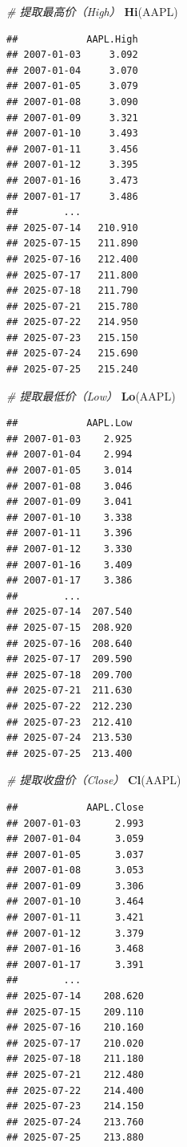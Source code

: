 \documentclass[]{ctexbook}
\newenvironment{Shaded}{\begin{snugshade}}{\end{snugshade}}
\newcommand{\CommentTok}[1]{\textcolor[rgb]{0.56,0.35,0.01}{\textit{#1}}}
\newcommand{\FunctionTok}[1]{\textcolor[rgb]{0.13,0.29,0.53}{\textbf{#1}}}
\newcommand{\NormalTok}[1]{#1}
\begin{document}
\begin{Shaded}
\begin{Highlighting}[]
\CommentTok{\# 提取最高价（High）}
\FunctionTok{Hi}\NormalTok{(AAPL)}
\end{Highlighting}
\end{Shaded}

\begin{verbatim}
##            AAPL.High
## 2007-01-03     3.092
## 2007-01-04     3.070
## 2007-01-05     3.079
## 2007-01-08     3.090
## 2007-01-09     3.321
## 2007-01-10     3.493
## 2007-01-11     3.456
## 2007-01-12     3.395
## 2007-01-16     3.473
## 2007-01-17     3.486
##        ...          
## 2025-07-14   210.910
## 2025-07-15   211.890
## 2025-07-16   212.400
## 2025-07-17   211.800
## 2025-07-18   211.790
## 2025-07-21   215.780
## 2025-07-22   214.950
## 2025-07-23   215.150
## 2025-07-24   215.690
## 2025-07-25   215.240
\end{verbatim}

\begin{Shaded}
\begin{Highlighting}[]
\CommentTok{\# 提取最低价（Low）}
\FunctionTok{Lo}\NormalTok{(AAPL)}
\end{Highlighting}
\end{Shaded}

\begin{verbatim}
##            AAPL.Low
## 2007-01-03    2.925
## 2007-01-04    2.994
## 2007-01-05    3.014
## 2007-01-08    3.046
## 2007-01-09    3.041
## 2007-01-10    3.338
## 2007-01-11    3.396
## 2007-01-12    3.330
## 2007-01-16    3.409
## 2007-01-17    3.386
##        ...         
## 2025-07-14  207.540
## 2025-07-15  208.920
## 2025-07-16  208.640
## 2025-07-17  209.590
## 2025-07-18  209.700
## 2025-07-21  211.630
## 2025-07-22  212.230
## 2025-07-23  212.410
## 2025-07-24  213.530
## 2025-07-25  213.400
\end{verbatim}

\begin{Shaded}
\begin{Highlighting}[]
\CommentTok{\# 提取收盘价（Close）}
\FunctionTok{Cl}\NormalTok{(AAPL)}
\end{Highlighting}
\end{Shaded}

\begin{verbatim}
##            AAPL.Close
## 2007-01-03      2.993
## 2007-01-04      3.059
## 2007-01-05      3.037
## 2007-01-08      3.053
## 2007-01-09      3.306
## 2007-01-10      3.464
## 2007-01-11      3.421
## 2007-01-12      3.379
## 2007-01-16      3.468
## 2007-01-17      3.391
##        ...           
## 2025-07-14    208.620
## 2025-07-15    209.110
## 2025-07-16    210.160
## 2025-07-17    210.020
## 2025-07-18    211.180
## 2025-07-21    212.480
## 2025-07-22    214.400
## 2025-07-23    214.150
## 2025-07-24    213.760
## 2025-07-25    213.880
\end{verbatim}
\end{document}
